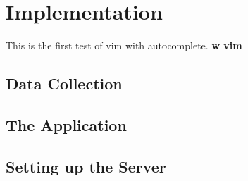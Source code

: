 \chapter{Implementation}
\label{chap:Implementation}
\noindent This is the first test of vim with autocomplete. \textbf{w vim}

\section{Data Collection}
\label{sec:Data Collection}


\section{The Application}
\label{sec:The Application}


\section{Setting up the Server}
\label{sec:Setting up the Server}
